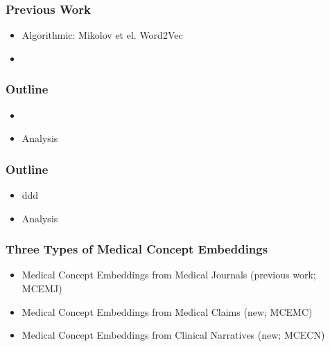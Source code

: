 \documentclass{beamer}
\begin{document}
\begin{frame}
\frametitle{Previous Work}
\begin{itemize}
\item Algorithmic: Mikolov et el. Word2Vec  
\item 

\end{itemize}
\end{frame}

\begin{frame}
\frametitle{Outline}
\begin{center}
\begin{itemize}
\item 

\item Analysis

\end{itemize}
\end{center}
\end{frame}

\begin{frame}
\frametitle{Outline}
\begin{center}
\begin{itemize}
\item ddd

\item Analysis

\end{itemize}
\end{center}
\end{frame}

\begin{frame}
\frametitle{Three Types of Medical Concept Embeddings}
\begin{itemize}
\item Medical Concept Embeddings from Medical
Journals (previous work; MCEMJ)

\bigskip

\item Medical Concept Embeddings from Medical Claims 
(new; MCEMC)

\bigskip

\item Medical Concept Embeddings from Clinical 
Narratives (new; MCECN)
\end{itemize}
\end{frame}
\end{document}
